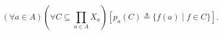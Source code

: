 $$(\forall a \in A) \left( \forall C \subseteq \prod_{a \in A} X_a \right) [p_a(C) \triangleq \{f(a) \mid f \in C\}].$$
